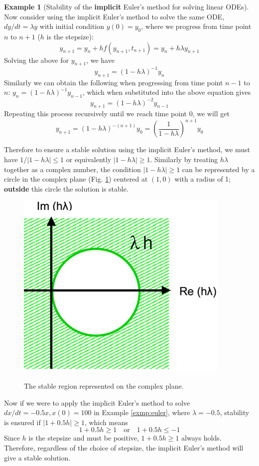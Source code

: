 \documentclass[a4paper,11pt]{article}
\theoremstyle{definition}
\newtheorem{exmp}{Example}[section]
\begin{document}
\begin{exmp}[Stability of the \textbf{implicit} Euler's method for solving linear ODEs]
Now consider using the implicit Euler's method to solve the same ODE, $d y / d t = \lambda y$ with initial condition $y(0) = y_0$, where
we progress from time point $n$ to $n+1$ ($h$ is the stepsize):
\[
	y_{n+1} = y_n + h f(y_{n+1}, t_{n+1}) = y_n + h \lambda y_{n+1}
\]
\noindent Solving the above for $y_{n+1}$, we have
\[
	y_{n+1} = (1 - h \lambda)^{-1} y_n
\]
\noindent Similarly we can obtain the following when progressing from time point $n-1$ to $n$:
$y_n = (1 - h \lambda )^{-1} y_{n-1}$, which when substituted into the above equation gives
\[
	y_{n+1} = (1 - h \lambda )^{-2} y_{n-1}
\]
\noindent Repeating this process recursively until we reach time point 0, we will get 
\[
	y_{n+1} = (1 - h \lambda )^{-(n+1)} y_0 =  \left( \frac{1}{1 - h \lambda} \right)^{n+1} y_0
\]

Therefore to ensure a stable solution using the implicit Euler's method, we must have
$ 1 / | 1 - h \lambda | \leq 1$ or equivalently $ | 1 - h \lambda | \geq 1$.
Similarly by treating $h \lambda$ together as a complex number, the condition
$| 1 - h \lambda | \geq 1$ can be represented by a circle in the complex plane (Fig. \ref{fig:stab_euler_imp})
centered at $(1, 0)$ with a radius of 1; \textbf{outside} this circle the solution is stable.

\begin{figure} [!h]
 \begin{center}
	\includegraphics[width=.4\textwidth]{stab_euler_imp}\\
 \end{center}
 \caption{The stable region represented on the complex plane.} 
 \label{fig:stab_euler_imp}
\end{figure}

Now if we were to apply the implicit Euler's method to solve $dx/dt=-0.5 x, x(0) = 100$ in Example \ref{exmp:euler},
where $\lambda = -0.5$, stability is ensured if $| 1 + 0.5 h | \geq 1$, which means
\[  1 + 0.5 h \geq 1 \quad \textrm{or} \quad 1 + 0.5h \leq -1 \]
\noindent Since $h$ is the stepsize and must be positive, $1 + 0.5 h \geq 1$ always holds.
Therefore, regardless of the choice of stepsize, the implicit Euler's method will give a stable solution.

\end{exmp}
\end{document}
